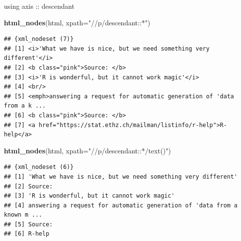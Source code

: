 \documentclass[ignorenonframetext,]{beamer}
\newenvironment{Shaded}{\begin{snugshade}}{\end{snugshade}}
\newcommand{\KeywordTok}[1]{\textcolor[rgb]{0.13,0.29,0.53}{\textbf{{#1}}}}
\newcommand{\DataTypeTok}[1]{\textcolor[rgb]{0.13,0.29,0.53}{{#1}}}
\newcommand{\StringTok}[1]{\textcolor[rgb]{0.31,0.60,0.02}{{#1}}}
\newcommand{\NormalTok}[1]{{#1}}
\begin{document}
\begin{frame}[fragile]{using axis :: descendant}

\begin{Shaded}
\begin{Highlighting}[]
\KeywordTok{html_nodes}\NormalTok{(html, }\DataTypeTok{xpath=}\StringTok{"//p/descendant::*"}\NormalTok{)}
\end{Highlighting}
\end{Shaded}

\begin{verbatim}
## {xml_nodeset (7)}
## [1] <i>'What we have is nice, but we need something very different'</i>
## [2] <b class="pink">Source: </b>
## [3] <i>'R is wonderful, but it cannot work magic'</i>
## [4] <br/>
## [5] <emph>answering a request for automatic generation of 'data from a k ...
## [6] <b class="pink">Source: </b>
## [7] <a href="https://stat.ethz.ch/mailman/listinfo/r-help">R-help</a>
\end{verbatim}

\begin{Shaded}
\begin{Highlighting}[]
\KeywordTok{html_nodes}\NormalTok{(html, }\DataTypeTok{xpath=}\StringTok{"//p/descendant::*/text()"}\NormalTok{)}
\end{Highlighting}
\end{Shaded}

\begin{verbatim}
## {xml_nodeset (6)}
## [1] 'What we have is nice, but we need something very different'
## [2] Source: 
## [3] 'R is wonderful, but it cannot work magic'
## [4] answering a request for automatic generation of 'data from a known m ...
## [5] Source: 
## [6] R-help
\end{verbatim}

\end{frame}
\end{document}
